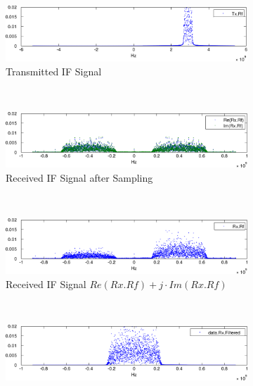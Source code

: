 \begin{figure}[p]
  \centering
  \begin{subfigure}{\textwidth}
    \centering
    \includegraphics[width=\textwidth]{figures/matlab/res_450_freq_uncorr_tx_rf}
    \caption{Transmitted \gls{IF} Signal}
    \label{fig:res_450_freq_uncorr_tx_rf}
  \end{subfigure}
  \vspace{4ex} \\
  \begin{subfigure}{\textwidth}
    \centering
    \includegraphics[width=\textwidth]{figures/matlab/res_450_freq_uncorr_rx_rf}
    \caption{Received \gls{IF} Signal after Sampling}
    \label{fig:res_450_freq_uncorr_rx_rf}
  \end{subfigure}
  \vspace{4ex} \\
  \begin{subfigure}{\textwidth}
    \centering
    \includegraphics[width=\textwidth]{figures/matlab/res_450_freq_uncorr_rx_rf_sup}
    \caption{Received \gls{IF} Signal $Re(Rx.Rf) + j \cdot Im(Rx.Rf)$}
    \label{fig:res_450_freq_uncorr_rx_rf_sup}
  \end{subfigure}
  \vspace{4ex} \\
  \begin{subfigure}{\textwidth}
    \centering
    \includegraphics[width=\textwidth]{figures/matlab/res_450_freq_uncorr_rx_usb}

\end{subfigure}
\end{figure}
